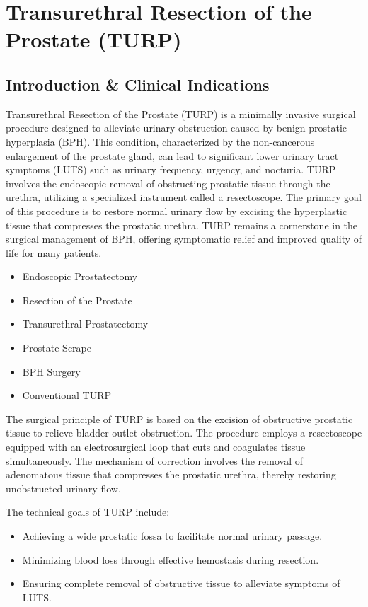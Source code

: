 \chapter{Transurethral Resection of the Prostate (TURP)}

\section*{Introduction \& Clinical Indications}
Transurethral Resection of the Prostate (TURP) is a minimally invasive surgical procedure designed to alleviate urinary obstruction caused by benign prostatic hyperplasia (BPH). This condition, characterized by the non-cancerous enlargement of the prostate gland, can lead to significant lower urinary tract symptoms (LUTS) such as urinary frequency, urgency, and nocturia. TURP involves the endoscopic removal of obstructing prostatic tissue through the urethra, utilizing a specialized instrument called a resectoscope. The primary goal of this procedure is to restore normal urinary flow by excising the hyperplastic tissue that compresses the prostatic urethra. TURP remains a cornerstone in the surgical management of BPH, offering symptomatic relief and improved quality of life for many patients.

\begin{itemize}
  \item Endoscopic Prostatectomy
  \item Resection of the Prostate
  \item Transurethral Prostatectomy
  \item Prostate Scrape
  \item BPH Surgery
  \item Conventional TURP
\end{itemize}

The surgical principle of TURP is based on the excision of obstructive prostatic tissue to relieve bladder outlet obstruction. The procedure employs a resectoscope equipped with an electrosurgical loop that cuts and coagulates tissue simultaneously. The mechanism of correction involves the removal of adenomatous tissue that compresses the prostatic urethra, thereby restoring unobstructed urinary flow. 

The technical goals of TURP include:

\begin{itemize}
  \item Achieving a wide prostatic fossa to facilitate normal urinary passage.
  \item Minimizing blood loss through effective hemostasis during resection.
  \item Ensuring complete removal of obstructive tissue to alleviate symptoms of LUTS.
\end{itemize}

